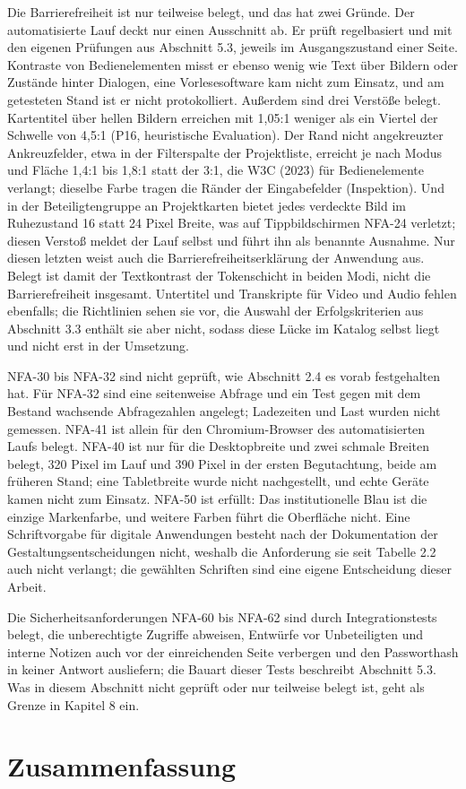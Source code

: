 Die Barrierefreiheit ist nur teilweise belegt, und das hat zwei Gründe. Der automatisierte Lauf deckt nur einen Ausschnitt ab. Er prüft regelbasiert und mit den eigenen Prüfungen aus Abschnitt 5.3, jeweils im Ausgangszustand einer Seite. Kontraste von Bedienelementen misst er ebenso wenig wie Text über Bildern oder Zustände hinter Dialogen, eine Vorlesesoftware kam nicht zum Einsatz, und am getesteten Stand ist er nicht protokolliert. Außerdem sind drei Verstöße belegt. Kartentitel über hellen Bildern erreichen mit 1,05:1 weniger als ein Viertel der Schwelle von 4,5:1 (P16, heuristische Evaluation). Der Rand nicht angekreuzter Ankreuzfelder, etwa in der Filterspalte der Projektliste, erreicht je nach Modus und Fläche 1,4:1 bis 1,8:1 statt der 3:1, die W3C (2023) für Bedienelemente verlangt; dieselbe Farbe tragen die Ränder der Eingabefelder (Inspektion). Und in der Beteiligtengruppe an Projektkarten bietet jedes verdeckte Bild im Ruhezustand 16 statt 24 Pixel Breite, was auf Tippbildschirmen NFA-24 verletzt; diesen Verstoß meldet der Lauf selbst und führt ihn als benannte Ausnahme. Nur diesen letzten weist auch die Barrierefreiheitserklärung der Anwendung aus. Belegt ist damit der Textkontrast der Tokenschicht in beiden Modi, nicht die Barrierefreiheit insgesamt. Untertitel und Transkripte für Video und Audio fehlen ebenfalls; die Richtlinien sehen sie vor, die Auswahl der Erfolgskriterien aus Abschnitt 3.3 enthält sie aber nicht, sodass diese Lücke im Katalog selbst liegt und nicht erst in der Umsetzung.

NFA-30 bis NFA-32 sind nicht geprüft, wie Abschnitt 2.4 es vorab festgehalten hat. Für NFA-32 sind eine seitenweise Abfrage und ein Test gegen mit dem Bestand wachsende Abfragezahlen angelegt; Ladezeiten und Last wurden nicht gemessen. NFA-41 ist allein für den Chromium-Browser des automatisierten Laufs belegt. NFA-40 ist nur für die Desktopbreite und zwei schmale Breiten belegt, 320 Pixel im Lauf und 390 Pixel in der ersten Begutachtung, beide am früheren Stand; eine Tabletbreite wurde nicht nachgestellt, und echte Geräte kamen nicht zum Einsatz. NFA-50 ist erfüllt: Das institutionelle Blau ist die einzige Markenfarbe, und weitere Farben führt die Oberfläche nicht. Eine Schriftvorgabe für digitale Anwendungen besteht nach der Dokumentation der Gestaltungsentscheidungen nicht, weshalb die Anforderung sie seit Tabelle 2.2 auch nicht verlangt; die gewählten Schriften sind eine eigene Entscheidung dieser Arbeit.

Die Sicherheitsanforderungen NFA-60 bis NFA-62 sind durch Integrationstests belegt, die unberechtigte Zugriffe abweisen, Entwürfe vor Unbeteiligten und interne Notizen auch vor der einreichenden Seite verbergen und den Passworthash in keiner Antwort ausliefern; die Bauart dieser Tests beschreibt Abschnitt 5.3. Was in diesem Abschnitt nicht geprüft oder nur teilweise belegt ist, geht als Grenze in Kapitel 8 ein.

\section{Zusammenfassung}
\label{sec:zusammenfassung-evaluation}

